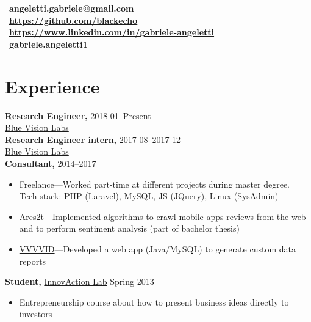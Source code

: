 \documentclass[margin]{res}
\begin{document}
    \address{235 Brick Lane \\ E2 7ED, London, UK  \\ (+44) 7803 056685}
    \begin{resume}
        \section{}
        \faEnvelope~\textbf{angeletti.gabriele@gmail.com} \\[5pt]
        \faGithub~\textbf{\url{https://github.com/blackecho}} \\[5pt]
        \faLinkedin~\textbf{\url{https://www.linkedin.com/in/gabriele-angeletti}} \\[5pt]
        \faSkype~\textbf{gabriele.angeletti1}

        \section{Experience}
            {\bf Research Engineer,} \hfill 2018-01--Present\\
            \href{http://www.bluevisionlabs.com}{Blue Vision Labs}\\
            {\bf Research Engineer intern,} \hfill 2017-08--2017-12\\
            \href{http://www.bluevisionlabs.com}{Blue Vision Labs}\\
            {\bf Consultant,} \hfill 2014--2017
            \begin{itemize} \itemsep-2pt    	
                \item Freelance---Worked part-time at different projects during master degree.\\
                    Tech stack: PHP (Laravel), MySQL, JS (JQuery), Linux (SysAdmin)
                \item \href{http://www.ares2t.com/en/web/home.php}{Ares2t}---Implemented algorithms to crawl
                    mobile apps reviews from the web and to perform sentiment analysis (part of bachelor thesis) 
                \item \href{https://www.vvvvid.it}{VVVVID}---Developed a web app (Java/MySQL) to generate custom
                    data reports
            \end{itemize}

            {\bf Student,} \href{http://www.innovactionlab.org/?lang=en}{InnovAction Lab} \hfill Spring 2013
            \begin{itemize} \itemsep-2pt
                \item Entrepreneurship course about how to present business ideas directly to investors
            \end{itemize}


\end{resume}
\end{document}
